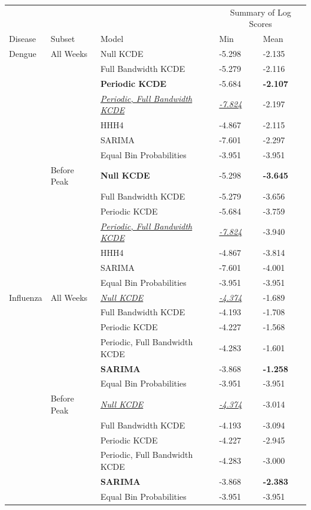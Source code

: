 \documentclass[times, doublespace]{simauth}\usepackage[]{graphicx}\usepackage[]{color}
\begin{document}
\begin{table}[hp]
\centering
\begin{tabular}{lllll}
\toprule
         &                    &          &              \multicolumn{2}{c}{Summary of Log Scores} \\
\cline{4-5}
 Disease & Subset & Model & Min & Mean \\
  \hline
Dengue & All Weeks & Null KCDE & -5.298 & -2.135\\
 &  & Full Bandwidth KCDE & -5.279 & -2.116\\
 &  & \textbf{Periodic KCDE} & -5.684 & \textbf{-2.107}\\
 &  & \underline{\emph{Periodic, Full Bandwidth KCDE}} & \underline{\emph{-7.824}} & -2.197\\
 &  & HHH4 & -4.867 & -2.115\\
 &  & SARIMA & -7.601 & -2.297\\
 &  & Equal Bin Probabilities & -3.951 & -3.951\\
\cline{2-5}
 & Before Peak & \textbf{Null KCDE} & -5.298 & \textbf{-3.645}\\
 &  & Full Bandwidth KCDE & -5.279 & -3.656\\
 &  & Periodic KCDE & -5.684 & -3.759\\
 &  & \underline{\emph{Periodic, Full Bandwidth KCDE}} & \underline{\emph{-7.824}} & -3.940\\
 &  & HHH4 & -4.867 & -3.814\\
 &  & SARIMA & -7.601 & -4.001\\
 &  & Equal Bin Probabilities & -3.951 & -3.951\\
\midrule
Influenza & All Weeks & \underline{\emph{Null KCDE}} & \underline{\emph{-4.374}} & -1.689\\
 &  & Full Bandwidth KCDE & -4.193 & -1.708\\
 &  & Periodic KCDE & -4.227 & -1.568\\
 &  & Periodic, Full Bandwidth KCDE & -4.283 & -1.601\\
 &  & \textbf{SARIMA} & -3.868 & \textbf{-1.258}\\
 &  & Equal Bin Probabilities & -3.951 & -3.951\\
\cline{2-5}
 & Before Peak & \underline{\emph{Null KCDE}} & \underline{\emph{-4.374}} & -3.014\\
 &  & Full Bandwidth KCDE & -4.193 & -3.094\\
 &  & Periodic KCDE & -4.227 & -2.945\\
 &  & Periodic, Full Bandwidth KCDE & -4.283 & -3.000\\
 &  & \textbf{SARIMA} & -3.868 & \textbf{-2.383}\\
 &  & Equal Bin Probabilities & -3.951 & -3.951\\


\end{tabular}
\end{table}
\end{document}
